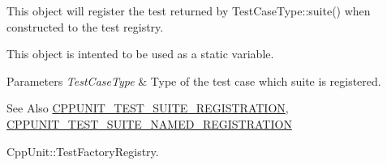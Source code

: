 This object will register the test returned by Test\-Case\-Type\-::suite() when constructed to the test registry.

This object is intented to be used as a static variable.


\begin{DoxyParams}{Parameters}
{\em Test\-Case\-Type} & Type of the test case which suite is registered. \\
\hline
\end{DoxyParams}
\begin{DoxySeeAlso}{See Also}
\hyperlink{_helper_macros_8h_a2f4071eec88d1e306665ada0f2dd80e4}{C\-P\-P\-U\-N\-I\-T\-\_\-\-T\-E\-S\-T\-\_\-\-S\-U\-I\-T\-E\-\_\-\-R\-E\-G\-I\-S\-T\-R\-A\-T\-I\-O\-N}, \hyperlink{_helper_macros_8h_a028a5855a40ad3836e2a26aa48cd4c91}{C\-P\-P\-U\-N\-I\-T\-\_\-\-T\-E\-S\-T\-\_\-\-S\-U\-I\-T\-E\-\_\-\-N\-A\-M\-E\-D\-\_\-\-R\-E\-G\-I\-S\-T\-R\-A\-T\-I\-O\-N} 

Cpp\-Unit\-::\-Test\-Factory\-Registry. 
\end{DoxySeeAlso}


